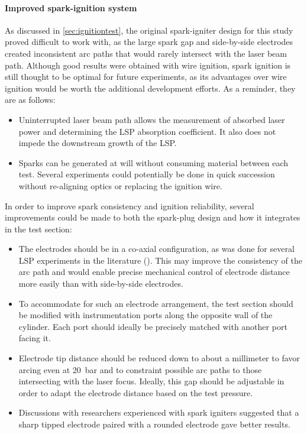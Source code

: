         \paragraph{Improved spark-ignition system} As discussed in \autoref{sec:ignitiontest}, the original spark-igniter design for this study proved difficult to work with, as the large spark gap and side-by-side electrodes created inconsistent arc paths that would rarely intersect with the laser beam path. Although good results were obtained with wire ignition, spark ignition is still thought to be optimal for future experiments, as its advantages over wire ignition would be worth the additional development efforts. As a reminder, they are as follows:
        \begin{itemize}
            \item Uninterrupted laser beam path allows the measurement of absorbed laser power and determining the LSP absorption coefficient. It also does not impede the downstream growth of the LSP.
            \item Sparks can be generated at will without consuming material between each test. Several experiments could potentially be done in quick succession without re-aligning optics or replacing the ignition wire.
        \end{itemize}
        In order to improve spark consistency and ignition reliability, several improvements could be made to both the spark-plug design and how it integrates in the test section:
        \begin{itemize}
            \item The electrodes should be in a co-axial configuration, as was done for several LSP experiments in the literature (\textcite{luCharacteristicDiagnosticsLaserStabilized2022, zimakovInteractionNearIRLaser2016,matsuiGeneratingConditionsArgon2019}). This may improve the consistency of the arc path and would enable precise mechanical control of electrode distance more easily than with side-by-side electrodes.
            \item To accommodate for such an electrode arrangement, the test section should be modified with instrumentation ports along the opposite wall of the cylinder. Each port should ideally be precisely matched with another port facing it.
            \item Electrode tip distance should be reduced down to about a millimeter to favor arcing even at \qty{20}{bar} and to constraint possible arc paths to those intersecting with the laser focus. Ideally, this gap should be adjustable in order to adapt the electrode distance based on the test pressure.
            \item Discussions with researchers experienced with spark igniters suggested that a sharp tipped electrode paired with a rounded electrode gave better results.
        \end{itemize}


